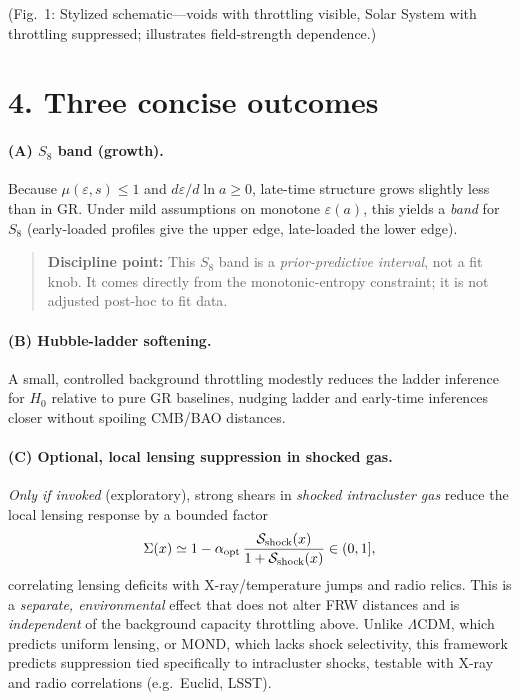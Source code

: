 \documentclass[aps,prd,onecolumn,superscriptaddress,nofootinbib]{revtex4-2}
\newcommand{\eps}{\varepsilon}
\newcommand{\Sig}{\Sigma}
\begin{document}
\medskip
\noindent (Fig.~1: Stylized schematic---voids with throttling visible, Solar System with throttling suppressed; illustrates field-strength dependence.)

\section*{4. Three concise outcomes}
\paragraph*{(A) $S_8$ band (growth).}
Because $\mu(\eps,s)\!\le\!1$ and $d\eps/d\ln a\!\ge\!0$, late-time structure grows slightly less than in GR. Under mild assumptions on monotone $\eps(a)$, this yields a \emph{band} for $S_8$ (early-loaded profiles give the upper edge, late-loaded the lower edge). 
\begin{quote}
\textbf{Discipline point:} This $S_8$ band is a \emph{prior-predictive interval}, not a fit knob. It comes directly from the monotonic-entropy constraint; it is not adjusted post-hoc to fit data.
\end{quote}

\paragraph*{(B) Hubble-ladder softening.}
A small, controlled background throttling modestly reduces the ladder inference for $H_0$ relative to pure GR baselines, nudging ladder and early-time inferences closer without spoiling CMB/BAO distances.

\paragraph*{(C) Optional, local lensing suppression in shocked gas.}
\emph{Only if invoked} (exploratory), strong shears in \emph{shocked intracluster gas} reduce the local lensing response by a bounded factor
\[
\Sig(x)\simeq 1-\alpha_{\rm opt}\,\frac{\mathcal{S}_{\rm shock}(x)}{1+\mathcal{S}_{\rm shock}(x)} \in (0,1],
\]
correlating lensing deficits with X-ray/temperature jumps and radio relics. This is a \emph{separate, environmental} effect that does not alter FRW distances and is \emph{independent} of the background capacity throttling above.
Unlike $\Lambda$CDM, which predicts uniform lensing, or MOND, which lacks shock selectivity, this framework predicts suppression tied specifically to intracluster shocks, testable with X-ray and radio correlations (e.g.\ Euclid, LSST).
\end{document}
